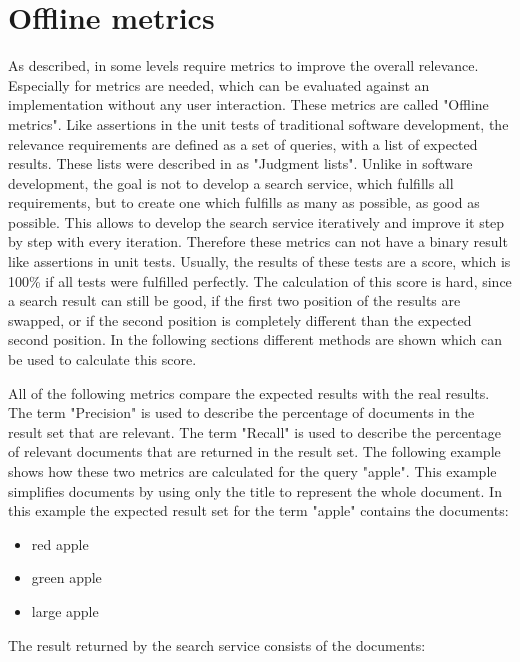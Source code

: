 \section{Offline metrics}
\label{ref:qa:offlinemetrics}

As described, in  some levels require metrics to improve the overall relevance.
Especially for  metrics are needed, which can be evaluated against an implementation
without any user interaction. These metrics are called "Offline metrics".
Like assertions in the unit tests of traditional software development,
the relevance requirements are defined as a set of queries, with a list of expected results.
These lists were described in  as "Judgment lists".
Unlike in software development, the goal is not to develop a search service,
which fulfills all requirements, but to create one which fulfills as many as possible, as good as possible.
This allows to develop the search service iteratively and improve it step by step with every iteration.
Therefore these metrics can not have a binary result like assertions in unit tests.
Usually, the results of these tests are a score, which is 100\% if all tests were fulfilled perfectly.
The calculation of this score is hard, since a search result can still be good, if the first two position of the results are swapped,
or if the second position is completely different than the expected second position.
In the following sections different methods are shown which can be used to calculate this score.
\par
All of the following metrics compare the expected results with the real results.
The term "Precision" is used to describe the percentage of documents in the result set that are relevant.
The term "Recall" is used to describe the percentage of relevant documents that are returned in the result set.
The following example shows how these two metrics are calculated for the query "apple".
This example simplifies documents by using only the title to represent the whole document.
In this example the expected result set for the term "apple" contains the documents: 
\begin{itemize}
	\item red apple
	\item green apple
	\item large apple
\end{itemize}
The result returned by the search service consists of the documents: 
